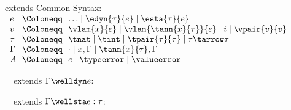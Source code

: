\begin{flushleft}

 extends Common Syntax:\\
$\begin{array}{l@{~~}c@{~~}l}
  e & \Coloneqq & \ldots \mid \edyn{\tau}{e} \mid \esta{\tau}{e}
\\
  v & \Coloneqq & \vlam{x}{e} \mid \vlam{\tann{x}{\tau}}{e} \mid i \mid \vpair{v}{v}
\\
  \tau & \Coloneqq & \tnat \mid \tint \mid \tpair{\tau}{\tau} \mid \tau \tarrow \tau
\\
  \Gamma & \Coloneqq & \cdot \mid x,\Gamma \mid \tann{x}{\tau},\Gamma
\\
  A & \Coloneqq & e \mid \typeerror \mid \valueerror
\end{array}$

\medskip
\begin{minipage}[t]{0.5\columnwidth}
~~extends $\Gamma \welldyn e$:\\
\begin{mathpar}
\end{mathpar}
\begin{mathpar}
\end{mathpar}
\end{minipage}%
\begin{minipage}[t]{0.5\columnwidth}
~~extends $\Gamma \wellsta e : \tau$:\\
\begin{mathpar}


\end{mathpar}
\end{minipage}
\end{flushleft}
